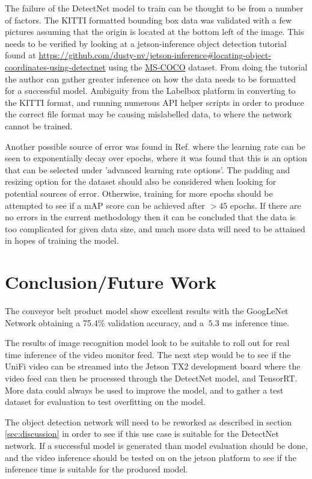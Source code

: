 \documentclass[10pt,journal,compsoc]{IEEEtran}
\begin{document}
The failure of the DetectNet model to train can be thought to be from a number of factors. The KITTI formatted bounding box data was validated with a few pictures assuming that the origin is located at the bottom left of the image. This needs to be verified by looking at a jetson-inference object detection tutorial found at \href{https://github.com/dusty-nv/jetson-inference#locating-object-coordinates-using-detectnet}{https://github.com/dusty-nv/jetson-inference\#locating-object-coordinates-using-detectnet} using the \href{http://cocodataset.org/\#home}{MS-COCO} dataset. From doing the tutorial the author can gather greater inference on how the data needs to be formatted for a successful model. Ambiguity from the Labelbox platform in converting to the KITTI format, and running numerous API helper scripts in order to produce the correct file format may be causing mislabelled data, to where the network cannot be trained.

Another possible source of error was found in Ref. \cite{DNwDIGITS} where the learning rate can be seen to exponentially decay over epochs, where it was found that this is an option that can be selected under 'advanced learning rate options'. The padding and resizing option for the dataset should also be considered when looking for potential sources of error. Otherwise, training for more epochs should be attempted to see if a mAP score can be achieved after $>45$ epochs. If there are no errors in the current methodology then it can be concluded that the data is too complicated for given data size, and much more data will need to be attained in hopes of training the model.

\section{Conclusion/Future Work}
\label{sec:conclusion}

The conveyor belt product model show excellent results with the GoogLeNet Network obtaining a 75.4\% validation accuracy, and a $~5.3$ ms inference time.

The results of image recognition model look to be suitable to roll out for real time inference of the video monitor feed. The next step would be to see if the UniFi video can be streamed into the Jetson TX2 development board where the video feed can then be processed through the DetectNet model, and TensorRT. More data could always be used to improve the model, and to gather a test dataset for evaluation to test overfitting on the model.

The object detection network will need to be reworked as described in section \ref{sec:discussion} in order to see if this use case is suitable for the DetectNet network. If a successful model is generated than model evaluation should be done, and the video inference should be tested on on the jetson platform to see if the inference time is suitable for the produced model.




\end{document}
